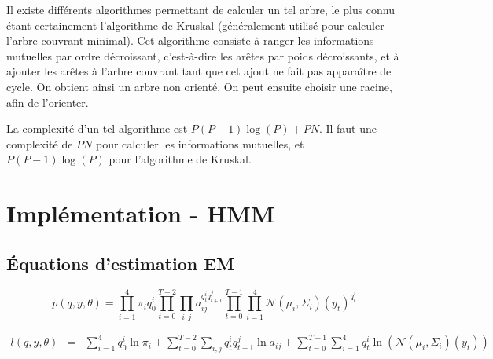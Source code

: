 \documentclass{article}
\begin{document}
Il existe différents algorithmes permettant de calculer un tel arbre, le plus
connu étant certainement l'algorithme de Kruskal (généralement utilisé pour
calculer l'arbre couvrant minimal). Cet algorithme consiste à ranger les
informations mutuelles par ordre décroissant, c'est-à-dire les arêtes par poids
décroissants, et à ajouter les arêtes à l'arbre couvrant tant que cet ajout ne
fait pas apparaître de cycle. On obtient ainsi un arbre non orienté. On peut
ensuite choisir une racine, afin de l'orienter.


La complexité d'un tel algorithme est $P(P-1)\log(P) + PN$. Il faut une
complexité de $PN$ pour calculer les informations mutuelles, et $P(P-1)\log(P)$
pour l'algorithme de Kruskal.

\section{Implémentation - HMM}
\subsection{Équations d'estimation EM}

\begin{equation}
p(q, y, \theta) =  \prod_{i = 1}^4 \pi_i {q_0^i} \prod_{t = 0}^{T - 2} \prod_{i, j} a_{ij}^{q_t^i q_{t + 1}^j} \prod_{t = 0}^{T - 1} \prod_{i = 1}^{4} \mathcal{N}(\mu_i, \Sigma_i)(y_t)^{q_t^i}
\end{equation}

\begin{align}
l(q, y, \theta) & = & \sum_{i = 1}^4 q_0^i \ln \pi_i + \sum_{t = 0}^{T - 2} \sum_{i, j} q_t^i q_{t + 1}^j \ln a_{ij} + \sum_{t = 0}^{T - 1} \sum_{i = 1}^4 q_t^i \ln(\mathcal{N}(\mu_i, \Sigma_i)(y_t))
\end{align}
\end{document}
